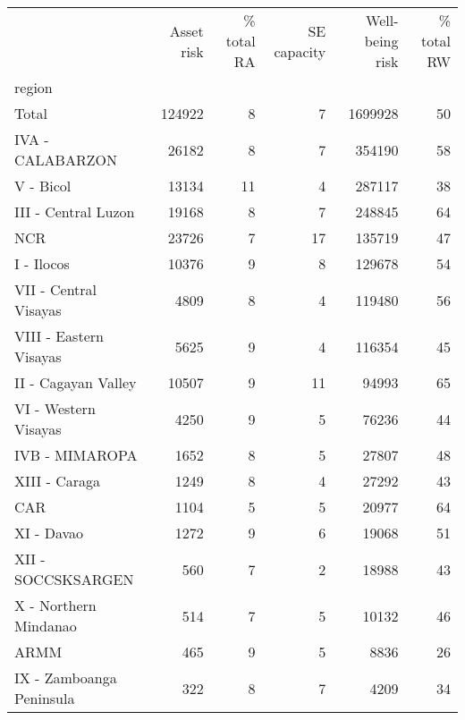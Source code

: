 \begin{tabular}{lrrrrr}
\toprule
{} &  Asset risk &  \% total RA &  SE capacity &  Well-being risk &  \% total RW \\
region                   &             &             &              &                  &             \\
\midrule
Total                    &      124922 &           8 &            7 &          1699928 &          50 \\
IVA - CALABARZON         &       26182 &           8 &            7 &           354190 &          58 \\
V - Bicol                &       13134 &          11 &            4 &           287117 &          38 \\
III - Central Luzon      &       19168 &           8 &            7 &           248845 &          64 \\
NCR                      &       23726 &           7 &           17 &           135719 &          47 \\
I - Ilocos               &       10376 &           9 &            8 &           129678 &          54 \\
VII - Central Visayas    &        4809 &           8 &            4 &           119480 &          56 \\
VIII - Eastern Visayas   &        5625 &           9 &            4 &           116354 &          45 \\
II - Cagayan Valley      &       10507 &           9 &           11 &            94993 &          65 \\
VI - Western Visayas     &        4250 &           9 &            5 &            76236 &          44 \\
IVB - MIMAROPA           &        1652 &           8 &            5 &            27807 &          48 \\
XIII - Caraga            &        1249 &           8 &            4 &            27292 &          43 \\
CAR                      &        1104 &           5 &            5 &            20977 &          64 \\
XI - Davao               &        1272 &           9 &            6 &            19068 &          51 \\
XII - SOCCSKSARGEN       &         560 &           7 &            2 &            18988 &          43 \\
X - Northern Mindanao    &         514 &           7 &            5 &            10132 &          46 \\
ARMM                     &         465 &           9 &            5 &             8836 &          26 \\
IX - Zamboanga Peninsula &         322 &           8 &            7 &             4209 &          34 \\
\bottomrule
\end{tabular}
